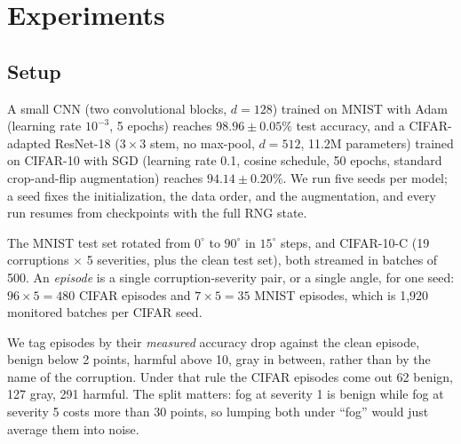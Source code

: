 \documentclass[graybox]{SNmult}
\begin{document}
\section{Experiments}
\label{sec:experiments}

\subsection{Setup}

A small CNN (two convolutional blocks, $d = 128$) trained on MNIST with Adam
(learning rate $10^{-3}$, 5 epochs) reaches $98.96 \pm 0.05\%$ test accuracy,
and a CIFAR-adapted ResNet-18 ($3{\times}3$ stem, no max-pool, $d = 512$,
11.2M parameters) trained on CIFAR-10 with SGD (learning rate 0.1, cosine
schedule, 50 epochs, standard crop-and-flip augmentation) reaches
$94.14 \pm 0.20\%$. We run five seeds per model; a seed fixes the
initialization, the data order, and the augmentation, and every run resumes
from checkpoints with the full RNG state.

The MNIST test set rotated from $0^\circ$ to $90^\circ$ in $15^\circ$ steps,
and CIFAR-10-C \cite{hendrycks2019benchmarking} (19 corruptions $\times$ 5
severities, plus the clean test set), both streamed in batches of 500. An
\emph{episode} is a single corruption-severity pair, or a single angle, for
one seed: $96 \times 5 = 480$ CIFAR episodes and $7 \times 5 = 35$ MNIST
episodes, which is 1{,}920 monitored batches per CIFAR seed.

We tag episodes by their \emph{measured} accuracy drop against the clean
episode, benign below 2 points, harmful above 10, gray in between, rather than
by the name of the corruption. Under that rule the CIFAR episodes come out 62
benign, 127 gray, 291 harmful. The split matters: fog at severity 1 is
benign while fog at severity 5 costs more than 30 points, so lumping both
under ``fog'' would just average them into noise.
\end{document}
